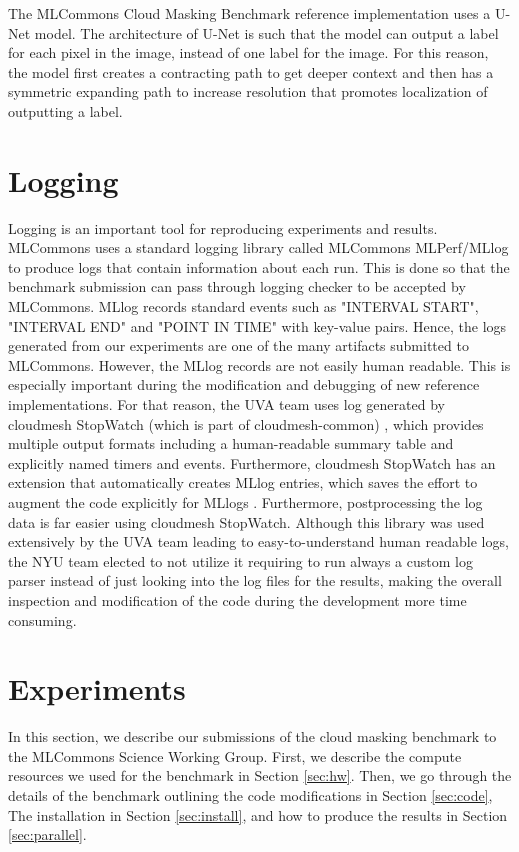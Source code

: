 \documentclass[sigplan,screen]{acmart}
\begin{document}
The MLCommons Cloud Masking Benchmark \cite{Thiyagalingam2022AIBF} reference implementation uses a U-Net \cite{Ronneberger2015UNetCN} model. The architecture of U-Net is such that the model can output a label for each pixel in the image, instead of one label for the image. For this reason, the model first creates a contracting path to get deeper context and then has a symmetric expanding path to increase resolution that promotes localization of outputting a label.

\section{Logging}

Logging is an important tool for reproducing experiments and results. MLCommons uses a standard logging library called MLCommons MLPerf/MLlog \cite{github-mlcommons-logging} to produce logs that contain information about each run. This is done so that the benchmark submission can pass through logging checker to be accepted by MLCommons. MLlog records standard events such as "INTERVAL START", "INTERVAL END" and "POINT IN TIME" with key-value pairs. Hence, the logs generated from our experiments are one of the many artifacts submitted to MLCommons. 
However, the MLlog records are not easily human readable. This is especially important during the modification and debugging of new reference implementations. For that reason, the UVA team uses log generated by  cloudmesh StopWatch  (which is part of cloudmesh-common) \citep{cloudmesh-stopwatch}, which provides multiple output formats including a human-readable summary table and explicitly named timers and events.  Furthermore, cloudmesh StopWatch has an extension that automatically creates MLlog entries, which saves the effort to augment the code explicitly for MLlogs . Furthermore, postprocessing the log data is far easier using cloudmesh StopWatch. Although this library was used extensively by the UVA team leading to easy-to-understand human readable logs, the NYU team elected to not utilize it requiring to run always a custom log parser instead of just looking into the log files for the results, making the overall inspection and modification of the code during the development more time consuming.

\section{Experiments}
\label{sec:exp}

In this section, we describe our submissions of the cloud masking benchmark to the MLCommons Science Working Group. First, we describe the compute resources we used for the benchmark in Section \ref{sec:hw}. Then, we go through the details of the benchmark outlining the code modifications in Section \ref{sec:code}, The installation in Section \ref{sec:install}, and how to produce the results in Section \ref{sec:parallel}.
\end{document}
